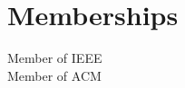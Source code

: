 \documentclass[letterpaper,12pt]{article}
\newcommand{\resumeItem}[2]{
  \item\small{
    \textbf{#1}{: #2 \vspace{-2pt}}
  }
}
\newcommand{\resumeSubItem}[2]{\resumeItem{#1}{#2}\vspace{-4pt}}
\newcommand{\resumeSubHeadingListStart}{\begin{itemize}[leftmargin=*]}
\newcommand{\resumeSubHeadingListEnd}{\end{itemize}}
\begin{document}
\section{Memberships}
{Member of IEEE}\\
{Member of ACM} 
 




\end{document}
